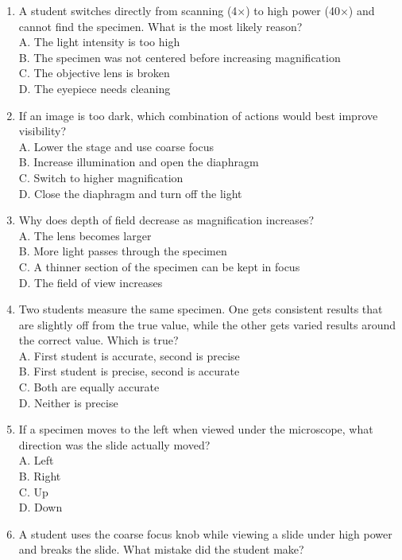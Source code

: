 \documentclass[
  letterpaper,
  DIV=11,
  numbers=noendperiod]{scrreprt}
\begin{document}
\begin{enumerate}
\def\labelenumi{\arabic{enumi}.}
\item
  A student switches directly from scanning (4×) to high power (40×) and
  cannot find the specimen. What is the most likely reason?\\
  A. The light intensity is too high\\
  B. The specimen was not centered before increasing magnification\\
  C. The objective lens is broken\\
  D. The eyepiece needs cleaning
\item
  If an image is too dark, which combination of actions would best
  improve visibility?\\
  A. Lower the stage and use coarse focus\\
  B. Increase illumination and open the diaphragm\\
  C. Switch to higher magnification\\
  D. Close the diaphragm and turn off the light
\item
  Why does depth of field decrease as magnification increases?\\
  A. The lens becomes larger\\
  B. More light passes through the specimen\\
  C. A thinner section of the specimen can be kept in focus\\
  D. The field of view increases
\item
  Two students measure the same specimen. One gets consistent results
  that are slightly off from the true value, while the other gets varied
  results around the correct value. Which is true?\\
  A. First student is accurate, second is precise\\
  B. First student is precise, second is accurate\\
  C. Both are equally accurate\\
  D. Neither is precise
\item
  If a specimen moves to the left when viewed under the microscope, what
  direction was the slide actually moved?\\
  A. Left\\
  B. Right\\
  C. Up\\
  D. Down
\item
  A student uses the coarse focus knob while viewing a slide under high
  power and breaks the slide. What mistake did the student make?\\

\end{enumerate}
\end{document}
